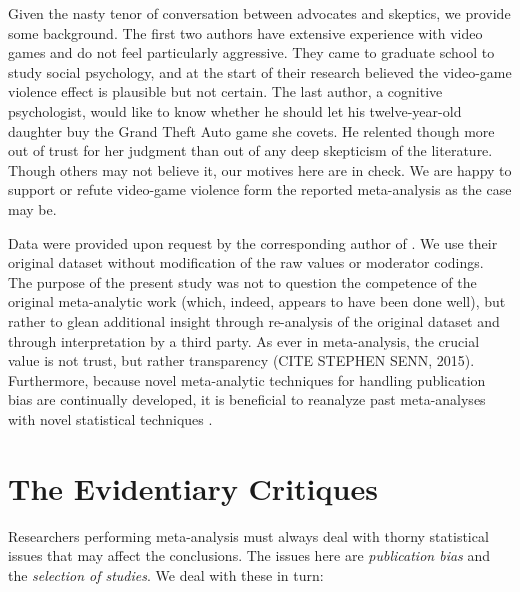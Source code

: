 \documentclass[man]{apa6}
\begin{document}
Given the nasty tenor of conversation between advocates and skeptics, we provide some background.  The first two authors have extensive experience with video games and do not feel particularly aggressive.  They came to graduate school to study social psychology, and at the start of their research believed the video-game violence effect is plausible but not certain.   The last author, a cognitive psychologist, would like to know whether he should let his twelve-year-old daughter buy the Grand Theft Auto game she covets.  He relented though more out of trust for her judgment than out of any deep skepticism of the literature.   Though others may not believe it, our motives here are in check.  We are happy to support or refute video-game violence form the reported meta-analysis as the case may be.

Data were provided upon request by the corresponding author of \citet{Anderson:etal:2010}. We use their original dataset without modification of the raw values or moderator codings. The purpose of the present study was not to question the competence of the original meta-analytic work (which, indeed, appears to have been done well), but rather to glean additional insight through re-analysis of the original dataset and through interpretation by a third party. As ever in meta-analysis, the crucial value is not trust, but rather transparency (CITE STEPHEN SENN, 2015). Furthermore, because novel meta-analytic techniques for handling publication bias are continually developed, it is beneficial to reanalyze past meta-analyses with novel statistical techniques \citep{Lakens:etal:2015}.

\section{The Evidentiary Critiques}

Researchers performing meta-analysis must always deal with thorny statistical issues that may affect the conclusions.  The issues here are {\em publication bias} and the {\em selection of studies}.  We deal with these in turn:
\end{document}
